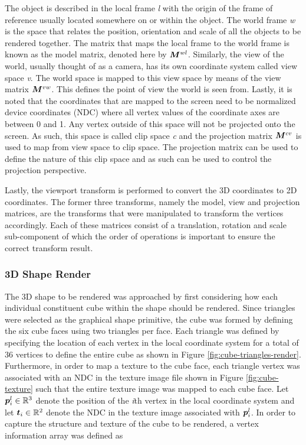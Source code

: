 The object is described in the local frame \textit{l} with the origin of the frame of reference usually located somewhere on or within the object. The world frame \textit{w} is the space  that relates the position, orientation and scale of all the objects to be rendered together. The matrix that maps the local frame to the world frame is known as the model matrix, denoted here by $\bm{M}^{wl}$. Similarly, the view of the world, usually thought of as a camera, has its own coordinate system called view space \textit{v}. The world space is mapped to this view space by means of the view matrix $\bm{M}^{vw}$. This defines the point of view the world is seen from. Lastly, it is noted that the coordinates that are mapped to the screen need to be normalized device coordinates (NDC) where all vertex values of the coordinate axes are between 0 and 1. Any vertex outside of this space will not be projected onto the screen. As such, this space is called clip space \textit{c} and the projection matrix $\bm{M}^{cv}$ is used to map from view space to clip space. The projection matrix can be used to define the nature of this clip space and as such can be used to control the projection perspective. 

Lastly, the viewport transform is performed to convert the 3D coordinates to 2D coordinates. The former three transforms, namely the model, view and projection matrices, are the transforms that were manipulated to transform the vertices accordingly. Each of these matrices consist of a translation, rotation and scale sub-component of which the order of operations is important to ensure the correct transform result.


\subsubsection{3D Shape Render}

The 3D shape to be rendered was approached by first considering how each individual constituent cube within the shape should be rendered. Since triangles were selected as the graphical shape primitive, the cube was formed by defining the six cube faces using two triangles per face. Each triangle was defined by specifying the location of each vertex in the local coordinate system for a total of 36 vertices to define the entire cube as shown in Figure \ref{fig:cube-triangles-render}. Furthermore, in order to map a texture to the cube face, each triangle vertex was associated with an NDC in the texture image file shown in Figure \ref{fig:cube-texture} such that the entire texture image was mapped to each cube face. Let $\bm{p}^l_i\in\mathbb{R}^3$ denote the position of the \textit{i}th vertex in the local coordinate system and let $\bm{t}_i\in\mathbb{R}^2$ denote the NDC in the texture image associated with $\bm{p}^l_i$. In order to capture the structure and texture of the cube to be rendered, a vertex information array was defined as


